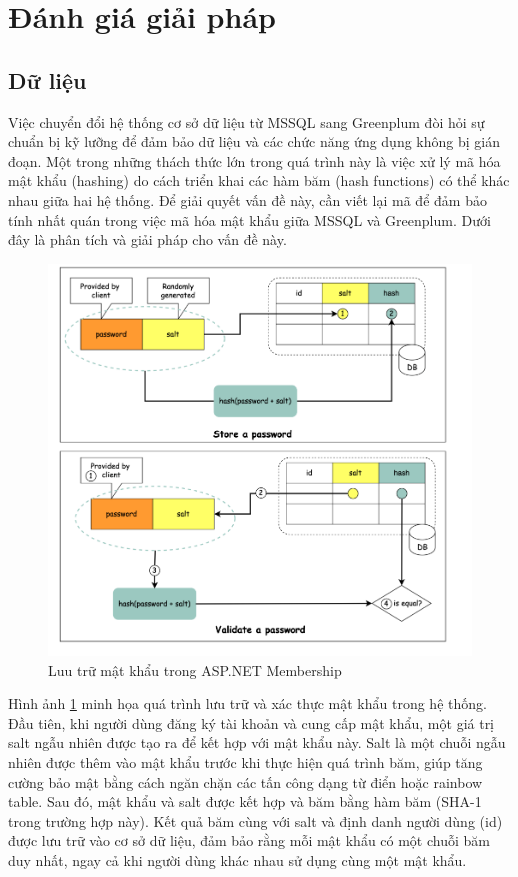 \documentclass[14pt]{article}
\begin{document}
\section{Đánh giá giải pháp}

\subsection{Dữ liệu}
Việc chuyển đổi hệ thống cơ sở dữ liệu từ MSSQL sang Greenplum đòi hỏi sự chuẩn bị kỹ lưỡng để đảm bảo dữ liệu và các chức năng ứng dụng không bị gián đoạn. Một trong những thách thức lớn trong quá trình này là việc xử lý mã hóa mật khẩu (hashing) do cách triển khai các hàm băm (hash functions) có thể khác nhau giữa hai hệ thống. Để giải quyết vấn đề này, cần viết lại mã để đảm bảo tính nhất quán trong việc mã hóa mật khẩu giữa MSSQL và Greenplum. Dưới đây là phân tích và giải pháp cho vấn đề này.

\begin{figure}
    \centering
    \includegraphics[width=0.5\linewidth]{images/StorePassword.png}
    \caption{Luu trữ mật khẩu trong ASP.NET Membership}
    \label{fig:StorePassword}
\end{figure}

Hình ảnh \ref{fig:StorePassword} minh họa quá trình lưu trữ và xác thực mật khẩu trong hệ thống. Đầu tiên, khi người dùng đăng ký tài khoản và cung cấp mật khẩu, một giá trị salt ngẫu nhiên được tạo ra để kết hợp với mật khẩu này. Salt là một chuỗi ngẫu nhiên được thêm vào mật khẩu trước khi thực hiện quá trình băm, giúp tăng cường bảo mật bằng cách ngăn chặn các tấn công dạng từ điển hoặc rainbow table. Sau đó, mật khẩu và salt được kết hợp và băm bằng hàm băm (SHA-1 trong trường hợp này). Kết quả băm cùng với salt và định danh người dùng (id) được lưu trữ vào cơ sở dữ liệu, đảm bảo rằng mỗi mật khẩu có một chuỗi băm duy nhất, ngay cả khi người dùng khác nhau sử dụng cùng một mật khẩu.
\end{document}

